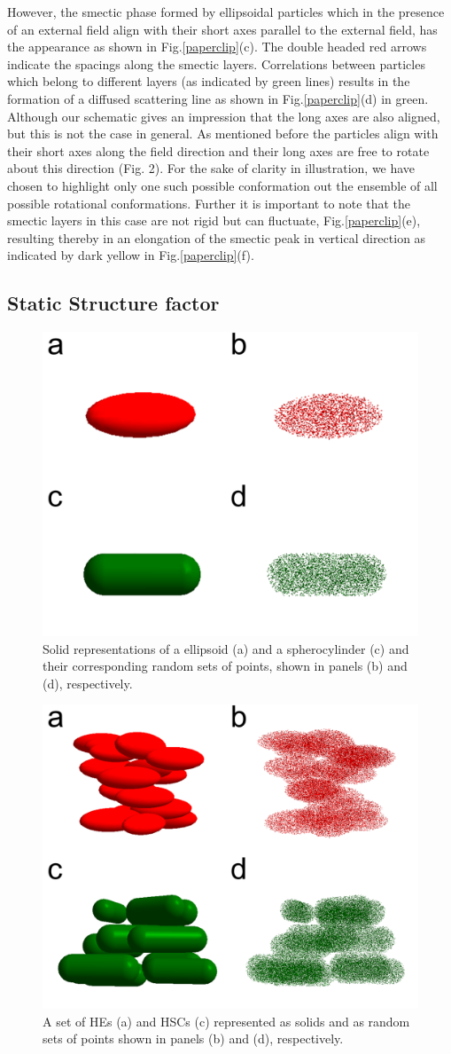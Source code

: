 \documentclass[aip,graphicx]{revtex4-1} %
\begin{document}
However, the smectic phase formed by ellipsoidal particles which in the presence of an external field align with their short axes parallel to the external
field, has the appearance as shown in Fig.\ref{paperclip}(c). The double headed red arrows indicate the spacings along the smectic layers. Correlations between
particles which belong to different layers (as indicated by green lines) results in the formation of a diffused scattering line as shown in
Fig.\ref{paperclip}(d) in green. Although our schematic gives an impression that the long axes are also aligned, but this is not the case in general. As
mentioned before the particles align with their short axes along the field direction and their long axes are free to rotate about this direction (Fig. 2). For
the sake of clarity in illustration, we have chosen to
highlight only one such possible conformation out the ensemble of all possible rotational conformations. Further it is important to note that the smectic layers
in this case are not rigid but can fluctuate, Fig.\ref{paperclip}(e), resulting thereby in an elongation of the smectic peak in vertical direction as indicated
by dark yellow in Fig.\ref{paperclip}(f).


\subsection{Static Structure factor}

\begin{figure}
    \centering
    \includegraphics[width=0.4\columnwidth]{Scatteringmodel_single.png}
    \caption{Solid representations of a ellipsoid (a) and a spherocylinder (c) and their corresponding random sets of points, shown 
     in panels (b) and (d), respectively.}\label{fig:scatt_mod_single}
\end{figure}

\begin{figure}
    \centering
    \includegraphics[width=0.4\columnwidth]{Scatteringmodel1.png}
    \caption{A set of HEs (a) and HSCs (c) represented as solids and as random sets of points 
    shown in panels (b) and (d), respectively.}\label{fig:scatt_mod1}
\end{figure}
\end{document}
